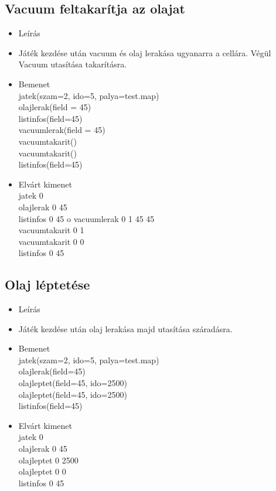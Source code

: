 \subsection{Vacuum feltakarítja az olajat}
\begin{itemize}
	\item Leírás\\
	\item Játék kezdése után vacuum és olaj lerakása ugyanarra a cellára. Végül Vacuum utasítása takarításra.
		\item Bemenet\\
		jatek(szam=2, ido=5, palya=test.map) \\
		olajlerak(field = 45) \\
		listinfos(field=45) \\		
		vacuumlerak(field = 45) \\
		vacuumtakarit() \\
		vacuumtakarit() \\		
		listinfos(field=45) \\
	\item Elvárt kimenet\\
		jatek 0 \\ 
		olajlerak 0 45 \\ 
		listinfos 0 45 o		
		vacuumlerak 0 1 45 45 \\ 
		vacuumtakarit 0 1 \\ 
		vacuumtakarit 0 0 \\ 
		listinfos 0 45 \\
\end{itemize}

\subsection{Olaj léptetése}
\begin{itemize}
	\item Leírás\\
	\item Játék kezdése után olaj lerakása majd utasítása száradásra.
	\item Bemenet\\
		jatek(szam=2, ido=5, palya=test.map) \\
		olajlerak(field=45) \\
		olajleptet(field=45, ido=2500) \\
		olajleptet(field=45, ido=2500) \\				
		listinfos(field=45) \\
	\item Elvárt kimenet\\
		jatek 0 \\
		olajlerak 0 45 \\ 
		olajleptet 0 2500 \\ 
		olajleptet 0 0 \\
		listinfos 0 45 \\		
\end{itemize}

